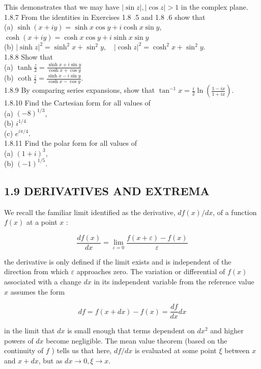 \documentclass[10pt]{article}
\begin{document}
This demonstrates that we may have $|\sin z|,|\cos z|>1$ in the complex plane.\\
1.8.7 From the identities in Exercises 1.8 .5 and 1.8 .6 show that\\
(a) $\sinh (x+i y)=\sinh x \cos y+i \cosh x \sin y$, $\cosh (x+i y)=\cosh x \cos y+i \sinh x \sin y$\\
(b) $|\sinh z|^{2}=\sinh ^{2} x+\sin ^{2} y, \quad|\cosh z|^{2}=\cosh ^{2} x+\sin ^{2} y$.\\
1.8.8 Show that\\
(a) $\tanh \frac{z}{2}=\frac{\sinh x+i \sin y}{\cosh x+\cos y}$\\
(b) $\operatorname{coth} \frac{z}{2}=\frac{\sinh x-i \sin y}{\cosh x-\cos y}$.\\
1.8.9 By comparing series expansions, show that $\tan ^{-1} x=\frac{i}{2} \ln \left(\frac{1-i x}{1+i x}\right)$.\\
1.8.10 Find the Cartesian form for all values of\\
(a) $(-8)^{1 / 3}$,\\
(b) $i^{1 / 4}$\\
(c) $e^{i \pi / 4}$.\\
1.8.11 Find the polar form for all values of\\
(a) $(1+i)^{3}$,\\
(b) $(-1)^{1 / 5}$.

\subsection*{1.9 DERIVATIVES AND EXTREMA}
We recall the familiar limit identified as the derivative, $d f(x) / d x$, of a function $f(x)$ at a point $x$ :


\begin{equation*}
\frac{d f(x)}{d x}=\lim _{\varepsilon=0} \frac{f(x+\varepsilon)-f(x)}{\varepsilon} \tag{1.139}
\end{equation*}


the derivative is only defined if the limit exists and is independent of the direction from which $\varepsilon$ approaches zero. The variation or differential of $f(x)$ associated with a change $d x$ in its independent variable from the reference value $x$ assumes the form


\begin{equation*}
d f=f(x+d x)-f(x)=\frac{d f}{d x} d x \tag{1.140}
\end{equation*}


in the limit that $d x$ is small enough that terms dependent on $d x^{2}$ and higher powers of $d x$ become negligible. The mean value theorem (based on the continuity of $f$ ) tells us that here, $d f / d x$ is evaluated at some point $\xi$ between $x$ and $x+d x$, but as $d x \rightarrow 0, \xi \rightarrow x$.
\end{document}
